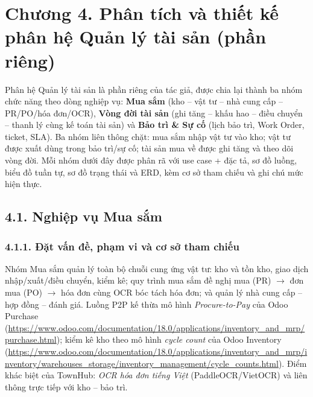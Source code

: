 \chapter*{Chương 4. Phân tích và thiết kế phân hệ Quản lý tài sản (phần riêng)}
Phân hệ Quản lý tài sản là phần riêng của tác giả, được chia lại thành ba nhóm chức năng theo dòng nghiệp vụ: \textbf{Mua sắm} (kho -- vật tư -- nhà cung cấp -- PR/PO/hóa đơn/OCR), \textbf{Vòng đời tài sản} (ghi tăng -- khấu hao -- điều chuyển -- thanh lý cùng kế toán tài sản) và \textbf{Bảo trì \& Sự cố} (lịch bảo trì, Work Order, ticket, SLA). Ba nhóm liên thông chặt: mua sắm nhập vật tư vào kho; vật tư được xuất dùng trong bảo trì/sự cố; tài sản mua về được ghi tăng và theo dõi vòng đời. Mỗi nhóm dưới đây được phân rã với use case + đặc tả, sơ đồ luồng, biểu đồ tuần tự, sơ đồ trạng thái và ERD, kèm cơ sở tham chiếu và ghi chú mức hiện thực.

\section*{4.1. Nghiệp vụ Mua sắm}
\subsection*{4.1.1. Đặt vấn đề, phạm vi và cơ sở tham chiếu}
Nhóm Mua sắm quản lý toàn bộ chuỗi cung ứng vật tư: kho và tồn kho, giao dịch nhập/xuất/điều chuyển, kiểm kê; quy trình mua sắm đề nghị mua (PR) $\rightarrow$ đơn mua (PO) $\rightarrow$ hóa đơn cùng OCR bóc tách hóa đơn; và quản lý nhà cung cấp -- hợp đồng -- đánh giá. Luồng P2P kế thừa mô hình \emph{Procure-to-Pay} của Odoo Purchase (\url{https://www.odoo.com/documentation/18.0/applications/inventory_and_mrp/purchase.html}); kiểm kê kho theo mô hình \emph{cycle count} của Odoo Inventory (\url{https://www.odoo.com/documentation/18.0/applications/inventory_and_mrp/inventory/warehouses_storage/inventory_management/cycle_counts.html}). Điểm khác biệt của TownHub: \emph{OCR hóa đơn tiếng Việt} (PaddleOCR/VietOCR) và liên thông trực tiếp với kho -- bảo trì.

